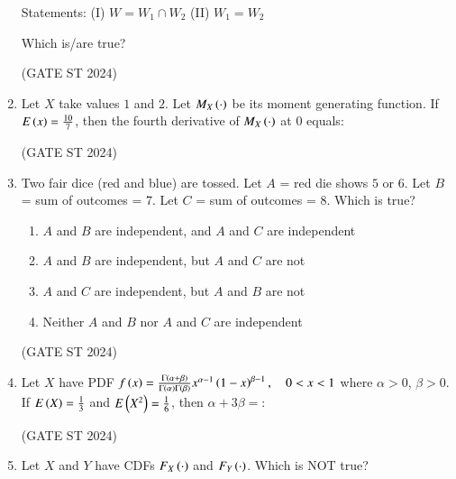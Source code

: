 \documentclass[journal,12pt,onecolumn]{IEEEtran}
\theoremstyle{remark}
\begin{document}
\begin{enumerate}
Statements:  
(I) $W = W_1 \cap W_2$  
(II) $W_1 = W_2$

Which is/are true?

\begin{enumerate}
\end{enumerate}
\hfill (GATE ST 2024)
\item 
Let $X$ take values $1$ and $2$. Let $M_X\left(\cdot\right)$ be its moment generating function. If $E\left(x\right) = \frac{10}{7}$, then the fourth derivative of $M_X\left(\cdot\right)$ at $0$ equals:

\begin{enumerate}
\end{enumerate}
\hfill (GATE ST 2024)
\item 
Two fair dice (red and blue) are tossed. Let $A$ = red die shows $5$ or $6$.  
Let $B$ = sum of outcomes = 7.  
Let $C$ = sum of outcomes = 8.  
Which is true?

\begin{enumerate}
\item $A$ and $B$ are independent, and $A$ and $C$ are independent
\item $A$ and $B$ are independent, but $A$ and $C$ are not
\item $A$ and $C$ are independent, but $A$ and $B$ are not
\item Neither $A$ and $B$ nor $A$ and $C$ are independent
\end{enumerate}
\hfill (GATE ST 2024)
\item 
Let $X$ have PDF
$
f\left(x\right) = \frac{\Gamma\left(\alpha+\beta\right)}{\Gamma\left(\alpha\right)\Gamma\left(\beta\right)} x^{\alpha-1} \left(1-x\right)^{\beta-1},\quad 0<x<1
$
where $\alpha>0$, $\beta>0$. If $E\left(X\right) = \frac13$ and $E\left(X^2\right) = \frac16$, then $\alpha + 3\beta =$:

\begin{enumerate}
\end{enumerate}
\hfill (GATE ST 2024)
\item 
Let $X$ and $Y$ have CDFs $F_X\left(\cdot\right)$ and $F_Y\left(\cdot\right)$. Which is NOT true?


\end{enumerate}
\end{document}
